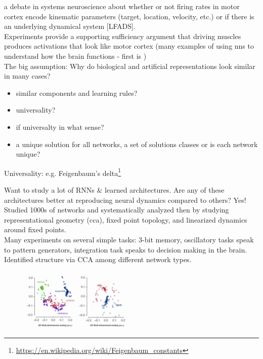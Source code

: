 \documentclass[12pt]{article}
\begin{document}
\cite{Churchland2012, Sussillo2015} a debate in systems neuroscience about whether or not firing rates in motor cortex encode kinematic parameters (target, location, velocity, etc.) or if there is an underlying dynamical system [LFADS].  \\

Experiments provide a supporting sufficiency argument that driving muscles produces activations that look like motor cortex (many examples of using nns to understand how the brain functions - first is \cite{Zipser1988}) \\

The big assumption: Why do biological and artificial representations look similar in many cases?
\begin{itemize}
    \item similar components and learning rules?
    \item universality?
    \item if universalty in what sense?
    \item a unique solution for all networks, a set of solutions classes or is each network unique?
\end{itemize}

Universality: e.g. Feigenbaum's delta\footnote{\url{https://en.wikipedia.org/wiki/Feigenbaum_constants}}

Want to study a lot of RNNs \& learned architectures. Are any of these architectures better at reproducing neural dynamics compared to others? Yes! Studied 1000s of networks and systematically analyzed then by studying representational geometry (cca), fixed point topology, and linearized dynamics around fixed points. \\

Many experiments on several simple tasks: 3-bit memory, oscillatory tasks speak to pattern generators, integration task speaks to decision making in the brain. \\

Identified structure via CCA among different network types.
\begin{figure}
  \centering
      \includegraphics[width=0.5\textwidth]{images/nnclust.png}
  \caption{}
\end{figure}
\end{document}
